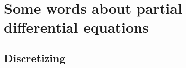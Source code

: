 % 


\section{Some words about partial differential equations}\label{some_words_on_PDEs}
\subsection{Discretizing}\label{discretizing}

